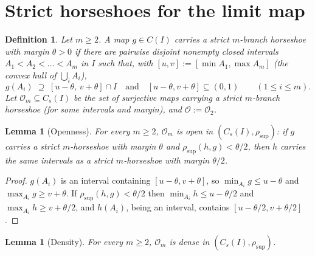 \documentclass[11pt]{article}
\newtheorem{lemma}[theorem]{Lemma}
\newtheorem{definition}[theorem]{Definition}
\newcommand{\I}{I}
\newcommand{\Cs}{C_s(\I)}
\newcommand{\rsup}{\rho_{\sup}}
\begin{document}
\section{Strict horseshoes for the limit map}\label{sec:horseshoe}

\begin{definition}\label{def:horseshoe}
Let $m\ge2$.  A map $g\in C(\I)$ carries a \emph{strict $m$-branch horseshoe} with
margin $\theta>0$ if there are pairwise disjoint nonempty closed intervals
$A_1<A_2<\dots<A_m$ in $\I$ such that, with
$[u,v]:=[\min A_1,\max A_m]$ (the convex hull of $\bigcup_iA_i$),
\[
g(A_i)\;\supseteq\;[u-\theta,\,v+\theta]\cap\I
\quad\text{and}\quad
[u-\theta,v+\theta]\subseteq(0,1)
\qquad(1\le i\le m).
\]
Let $\mathcal O_m\subseteq\Cs$ be the set of surjective maps carrying a strict
$m$-branch horseshoe (for some intervals and margin), and $\mathcal O:=\mathcal O_2$.
\end{definition}

\begin{lemma}[Openness]\label{lem:open}
For every $m\ge2$, $\mathcal O_m$ is open in $(\Cs,\rsup)$: if $g$ carries a strict
$m$-horseshoe with margin $\theta$ and $\rsup(h,g)<\theta/2$, then $h$ carries the
same intervals as a strict $m$-horseshoe with margin $\theta/2$.
\end{lemma}

\begin{proof}
$g(A_i)$ is an interval containing $[u-\theta,v+\theta]$, so
$\min_{A_i}g\le u-\theta$ and $\max_{A_i}g\ge v+\theta$.  If
$\rsup(h,g)<\theta/2$ then $\min_{A_i}h\le u-\theta/2$ and
$\max_{A_i}h\ge v+\theta/2$, and $h(A_i)$, being an interval, contains
$[u-\theta/2,v+\theta/2]$.
\end{proof}

\begin{lemma}[Density]\label{lem:dense}
For every $m\ge2$, $\mathcal O_m$ is dense in $(\Cs,\rsup)$.
\end{lemma}
\end{document}
